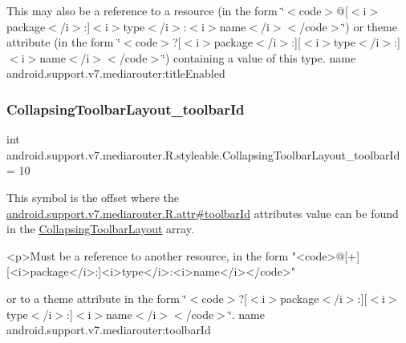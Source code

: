 This may also be a reference to a resource (in the form \char`\"{}$<$code$>$@\mbox{[}$<$i$>$package$<$/i$>$\+:\mbox{]}$<$i$>$type$<$/i$>$\+:$<$i$>$name$<$/i$>$$<$/code$>$\char`\"{}) or theme attribute (in the form \char`\"{}$<$code$>$?\mbox{[}$<$i$>$package$<$/i$>$\+:\mbox{]}\mbox{[}$<$i$>$type$<$/i$>$\+:\mbox{]}$<$i$>$name$<$/i$>$$<$/code$>$\char`\"{}) containing a value of this type.  name android.\+support.\+v7.\+mediarouter\+:title\+Enabled \mbox{\label{classandroid_1_1support_1_1v7_1_1mediarouter_1_1R_1_1styleable_a4dcf16bdea9427a02434b698abe1f176}} 
\subsubsection{\texorpdfstring{Collapsing\+Toolbar\+Layout\+\_\+toolbar\+Id}{CollapsingToolbarLayout\_toolbarId}}
{\footnotesize\ttfamily int android.\+support.\+v7.\+mediarouter.\+R.\+styleable.\+Collapsing\+Toolbar\+Layout\+\_\+toolbar\+Id = 10\hspace{0.3cm}{\ttfamily [static]}}

This symbol is the offset where the \hyperlink{classandroid_1_1support_1_1v7_1_1mediarouter_1_1R_1_1attr_a5a15482337bdff53ccc3d196da6e123f}{android.\+support.\+v7.\+mediarouter.\+R.\+attr\#toolbar\+Id} attribute\textquotesingle{}s value can be found in the \hyperlink{classandroid_1_1support_1_1v7_1_1mediarouter_1_1R_1_1styleable_aae2cb4975e9b9a19d129888f497cc386}{Collapsing\+Toolbar\+Layout} array.

\begin{DoxyVerb}      <p>Must be a reference to another resource, in the form "<code>@[+][<i>package</i>:]<i>type</i>:<i>name</i></code>"
\end{DoxyVerb}
 or to a theme attribute in the form \char`\"{}$<$code$>$?\mbox{[}$<$i$>$package$<$/i$>$\+:\mbox{]}\mbox{[}$<$i$>$type$<$/i$>$\+:\mbox{]}$<$i$>$name$<$/i$>$$<$/code$>$\char`\"{}.  name android.\+support.\+v7.\+mediarouter\+:toolbar\+Id \mbox{\label{classandroid_1_1support_1_1v7_1_1mediarouter_1_1R_1_1styleable_a9eda6207848fcda69affb749b57b23b9}} 

